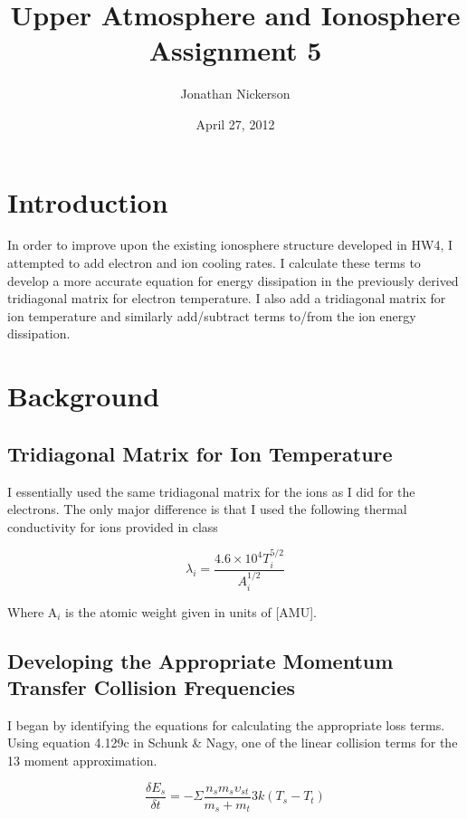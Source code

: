 \documentclass[10pt]{article}
\begin{document}
\title{Upper Atmosphere and Ionosphere Assignment 5}
\author{Jonathan Nickerson}
\date{April 27, 2012}
\maketitle

\section{Introduction}
In order to improve upon the existing ionosphere structure developed in HW4, I attempted to add electron and ion cooling rates. I calculate these terms to develop a more accurate equation for energy dissipation in the previously derived tridiagonal matrix for electron temperature. I also add a tridiagonal matrix for ion temperature and similarly add/subtract terms to/from the ion energy dissipation.

\section{Background}
\subsection{Tridiagonal Matrix for Ion Temperature}
I essentially used the same tridiagonal matrix for the ions as I did for the electrons. The only major difference is that I used the following thermal conductivity for ions provided in class

\begin{equation}
\lambda _{i} = \frac{4.6 \times 10^{4} T_{i}^{5/2}}{A_{i}^{1/2}}
\end{equation}

\noindent Where A$_{i}$ is the atomic weight given in units of [AMU].

\subsection{Developing the Appropriate Momentum Transfer Collision Frequencies}
I began by identifying the equations for calculating the appropriate loss terms. Using equation 4.129c in Schunk \& Nagy, one of the linear collision terms for the 13 moment approximation.

\begin{equation}
\frac{\delta E_{s}}{ \delta t} = - \Sigma \frac{n_{s}m_{s}\upsilon _{st}}{m_{s} + m_{t}} 3k(T_{s}-T_{t})
\end{equation}
\end{document}
